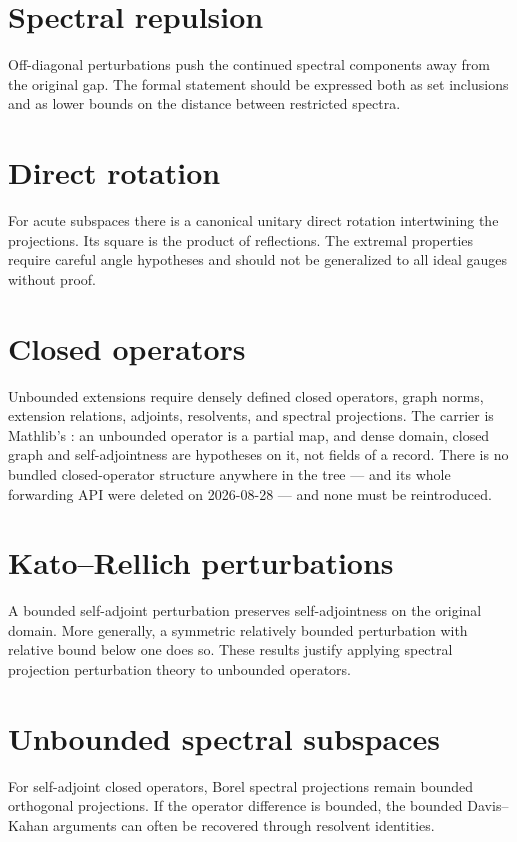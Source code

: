 \documentclass{article}
\begin{document}
\section{Spectral repulsion}
Off-diagonal perturbations push the continued spectral components away from
the original gap.  The formal statement should be expressed both as set
inclusions and as lower bounds on the distance between restricted spectra.

\section{Direct rotation}
For acute subspaces there is a canonical unitary direct rotation intertwining
the projections.  Its square is the product of reflections.  The extremal
properties require careful angle hypotheses and should not be generalized to
all ideal gauges without proof.

\section{Closed operators}
Unbounded extensions require densely defined closed operators, graph norms,
extension relations, adjoints, resolvents, and spectral projections.  The
carrier is Mathlib's : an unbounded operator is a partial map,
and dense domain, closed graph and self-adjointness are hypotheses on it, not
fields of a record.  There is no bundled closed-operator structure anywhere in
the tree ---  and its whole
forwarding API were deleted on 2026-08-28 --- and none must be reintroduced.

\section{Kato--Rellich perturbations}
A bounded self-adjoint perturbation preserves self-adjointness on the original
domain.  More generally, a symmetric relatively bounded perturbation with
relative bound below one does so.  These results justify applying spectral
projection perturbation theory to unbounded operators.

\section{Unbounded spectral subspaces}
For self-adjoint closed operators, Borel spectral projections remain bounded
orthogonal projections.  If the operator difference is bounded, the bounded
Davis--Kahan arguments can often be recovered through resolvent identities.
\end{document}
